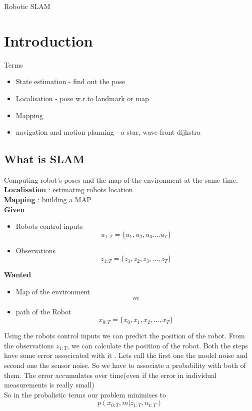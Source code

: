 \documentclass{article}
\begin{document}
Robotic SLAM 
\section{Introduction}
Terms 

\begin{itemize}
    \item State estimation - find out the pose 
    \item Localisation - pose w.r.to landmark or map
    \item Mapping 
   \item navigation and motion planning - a star, wave front dijkstra 
\end{itemize}

\subsection{What is SLAM}
    Computing robot's poses and the map of the environment at the 
    same time.
\textbf{Localisation} : estimating robots location\\ 
\textbf{Mapping}      : building a MAP\\

\textbf{Given}

\begin{itemize}
    \item Robots control inputs   $$u_{1:T} = \{u_1,u_2,u_3....u_T\}$$
    \item Observations $$z_{1:T} = \{z_1,z_2,z_3,...,z_T\}$$
\end{itemize}

\textbf{Wanted}
\begin{itemize}
    \item Map of the environment $$m$$
    \item path of the Robot $$x_{0:T} = \{x_0,x_1,x_2,...,x_T\}$$
\end{itemize}

Using the robots control inputs we can predict the position of the robot.
From the observations $z_{1:T}$, we can calculate the position of the robot. 
Both the steps have some error associcated with it . Lets call the first
one the model noise and second one the sensor noise. So we have to associate 
a probability with both of them. The error accumulates over time(even if the
error in individual measurements is really small)\\

So in the probalistic terms our problem minimises to 
$$p(x_{0:T},m|z_{1:T},u_{1:T})$$
\end{document}
